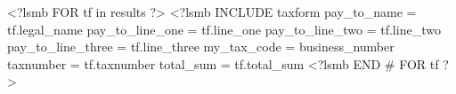 \documentclass[usletter]{article}
\begin{document}
<?lsmb FOR tf in results ?>
<?lsmb INCLUDE taxform 
pay_to_name = tf.legal_name
pay_to_line_one = tf.line_one
pay_to_line_two = tf.line_two
pay_to_line_three = tf.line_three
my_tax_code = business_number
taxnumber = tf.taxnumber
total_sum = tf.total_sum
<?lsmb END # FOR tf  ?>
\end{document}
